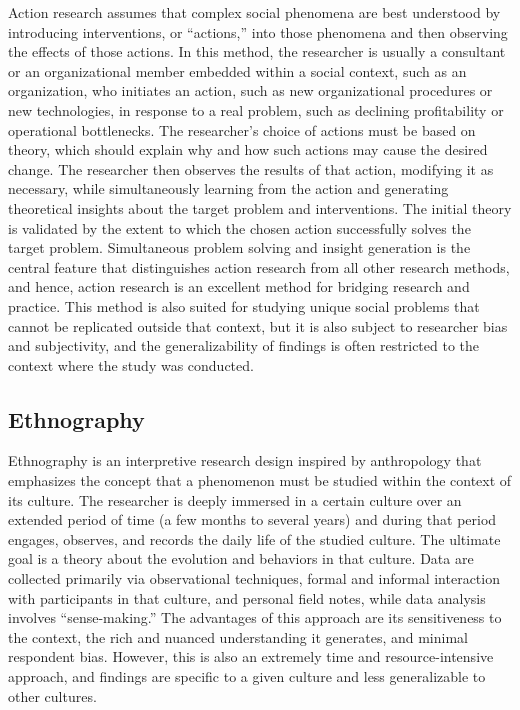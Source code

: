 Action research assumes that complex social phenomena are best understood by introducing interventions, or ``actions,'' into those phenomena and then observing the effects of those actions. In this method, the researcher is usually a consultant or an organizational member embedded within a social context, such as an organization, who initiates an action, such as new organizational procedures or new technologies, in response to a real problem, such as declining profitability or operational bottlenecks. The researcher's choice of actions must be based on theory, which should explain why and how such actions may cause the desired change. The researcher then observes the results of that action, modifying it as necessary, while simultaneously learning from the action and generating theoretical insights about the target problem and interventions. The initial theory is validated by the extent to which the chosen action successfully solves the target problem. Simultaneous problem solving and insight generation is the central feature that distinguishes action research from all other research methods, and hence, action research is an excellent method for bridging research and practice. This method is also suited for studying unique social problems that cannot be replicated outside that context, but it is also subject to researcher bias and subjectivity, and the generalizability of findings is often restricted to the context where the study was conducted.

\subsection{Ethnography}

Ethnography is an interpretive research design inspired by anthropology that emphasizes the concept that a phenomenon must be studied within the context of its culture. The researcher is deeply immersed in a certain culture over an extended period of time (a few months to several years) and during that period engages, observes, and records the daily life of the studied culture. The ultimate goal is a theory about the evolution and behaviors in that culture. Data are collected primarily via observational techniques, formal and informal interaction with participants in that culture, and personal field notes, while data analysis involves ``sense-making.'' The advantages of this approach are its sensitiveness to the context, the rich and nuanced understanding it generates, and minimal respondent bias. However, this is also an extremely time and resource-intensive approach, and findings are specific to a given culture and less generalizable to other cultures.

